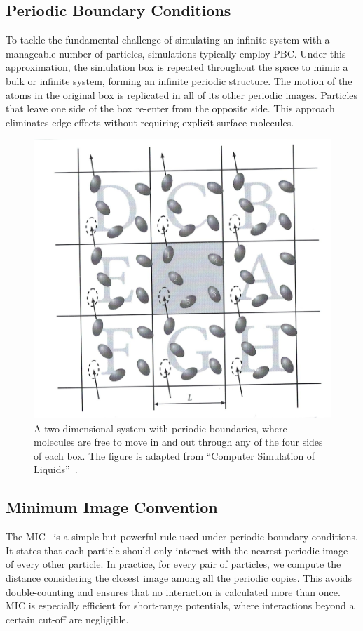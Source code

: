 \subsection{Periodic Boundary Conditions}
To tackle the fundamental challenge of simulating an infinite system with a manageable number of particles, simulations typically employ \ac{PBC}. Under this approximation, the simulation box is repeated throughout the space to mimic a bulk or infinite system, forming an infinite periodic structure. The motion of the atoms in the original box is replicated in all of its other periodic images. Particles that leave one side of the box re-enter from the opposite side. This approach eliminates edge effects without requiring explicit surface molecules.
\begin{figure}
    \centering
    \includegraphics[width=0.75\linewidth]{images/periodic.png}
    \caption{A two-dimensional system with periodic boundaries, where molecules are free to move in and out through any of the four sides of each box. The figure is
 adapted from ``Computer Simulation of Liquids''~\cite{simulation_of_liq}.}
    \label{fig:periodic}
\end{figure}
\subsection{Minimum Image Convention}
The \ac{MIC}~\cite{minimumimage,hloucha1998fast} is a simple but powerful rule used under periodic boundary conditions. It states that each particle should only interact with the nearest periodic image of every other particle. In practice, for every pair of particles, we compute the distance considering the closest image among all the periodic copies. This avoids double-counting and ensures that no interaction is calculated more than once. MIC is especially efficient for short-range potentials, where interactions beyond a certain cut-off are negligible. 

